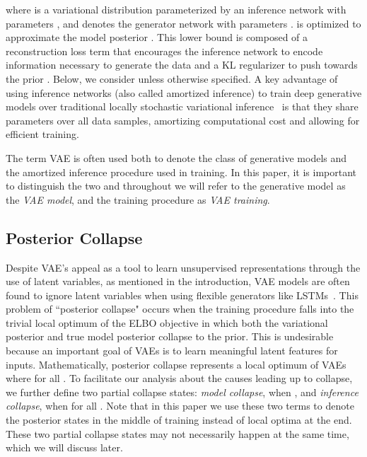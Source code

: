 \documentclass{article} \usepackage{iclr2019_conference,times}
\begin{document}
where  is a variational distribution parameterized by an inference network with parameters , and  denotes the generator network with parameters .  is optimized to approximate the model posterior . This lower bound is composed of a reconstruction loss term that encourages the inference network to encode information necessary to generate the data and a KL regularizer to push  towards the prior . Below, we consider  unless otherwise specified. A key advantage of using inference networks (also called amortized inference) to train deep generative models over traditional locally stochastic variational inference~\citep{hoffman2013stochastic} is that they share parameters over all data samples, 
amortizing computational cost and allowing for efficient training.

The term VAE is often used both to denote the class of generative models and the amortized inference procedure used in training. 
In this paper, it is important to distinguish the two and throughout we will refer to the generative model as the \textit{VAE model},
and the training procedure as \textit{VAE training}.




\subsection{Posterior Collapse}
Despite VAE's appeal as a tool to learn unsupervised representations through the use of latent variables, as mentioned in the introduction, VAE models are often found to ignore latent variables when using flexible generators like LSTMs~\citep{bowman2015generating}. This problem of ``posterior collapse" occurs when the training procedure falls into the trivial local optimum of the ELBO objective in which both the variational posterior and true model posterior collapse to the prior. This is undesirable because an important goal of VAEs is to learn meaningful latent features for inputs. Mathematically, posterior collapse represents a local optimum of VAEs where  for all . To facilitate our analysis about the causes leading up to collapse, we further define two partial collapse states: \textit{model collapse}, when , and \textit{inference collapse}, when  for all . Note that in this paper we use these two terms to denote the posterior states in the middle of training instead of local optima at the end. These two partial collapse states may not necessarily happen at the same time, which we will discuss later.
\end{document}
